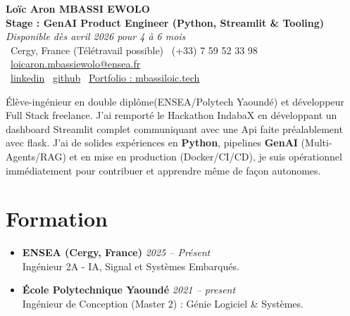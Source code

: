 \documentclass[a4paper,11pt]{article}
\begin{document}
\begin{center}
    {\Large \textbf{Loïc Aron MBASSI EWOLO}} \\ \vspace{4pt}
    \textbf{\large Stage : GenAI Product Engineer (Python, Streamlit \& Tooling)} \\
    \textit{\small Disponible dès avril 2026 pour 4 à 6 mois} \\ \vspace{4pt}
    \small
    \faMapMarker\ Cergy, France (Télétravail possible) \quad
    \faPhone\ (+33) 7 59 52 33 98 \quad
    \faEnvelope\ \href{mailto:loicaron.mbassiewolo@ensea.fr}{loicaron.mbassiewolo@ensea.fr} \\ \vspace{2pt}
    \faLinkedin\ \href{https://www.linkedin.com/in/loic-aron-mbassi-ewolo-3942a9246/}{linkedin} \quad
    \faGithub\ \href{https://github.com/Nameless0l}{github} \quad
    \faGlobe\ \href{https://mbassiloic.tech/#portfolio}{Portfolio : mbassiloic.tech}
\end{center}

\vspace{-6pt}

\noindent\small{Élève-ingénieur en double diplôme(ENSEA/Polytech Yaoundé) et développeur Full Stack freelance. J'ai remporté le Hackathon IndabaX en développant un dashboard Streamlit complet communiquant avec une Api faite préalablement avec flask. J'ai de solides expériences en \textbf{Python}, pipelines \textbf{GenAI} (Multi-Agents/RAG) et  en mise en production (Docker/CI/CD), je suis opérationnel immédiatement pour contribuer et apprendre même de façon autonomes.}
\section{Formation}
\begin{itemize}[leftmargin=*, label={.}, nosep]
    \item \textbf{ENSEA (Cergy, France)} \hfill \textit{2025 -- Présent} \\
    \small{Ingénieur 2A - IA, Signal et Systèmes Embarqués.}
    \item \textbf{École Polytechnique Yaoundé} \hfill \textit{2021 -- present} \\
    \small{Ingénieur de Conception (Master 2) : Génie Logiciel \& Systèmes.}
\end{itemize}

\end{document}
